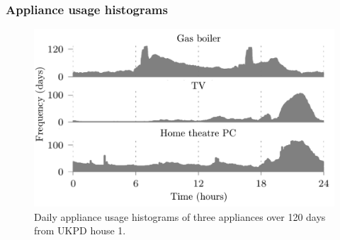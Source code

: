 \documentclass{sig-alternate}
\begin{document}
%
%
%

\subsubsection{Appliance usage histograms}
\label{sec:usage_hist}
\begin{figure}[!t]
  \centering
  \includegraphics[width=\columnwidth]{figures/daily_usage_histograms3.pdf}
  \caption{Daily appliance usage histograms of three appliances over 120 days from UKPD house 1.}
  \label{fig:daily_usage_histograms}
\end{figure} 
\end{document}
